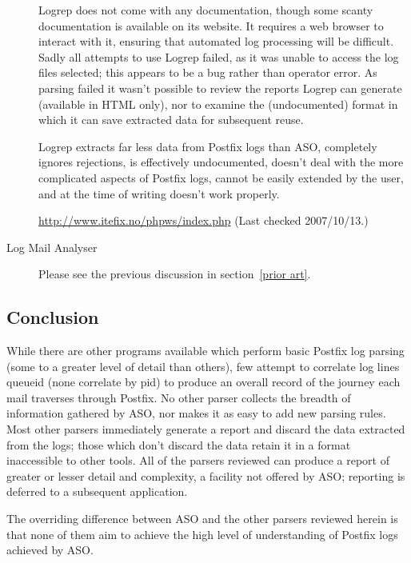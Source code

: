 \documentclass[a4paper,12pt,draft]{article}
\newcommand{\parsername}{ASO}
\begin{document}
\begin{description}
        Logrep does not come with any documentation, though some scanty
        documentation is available on its website.  It requires a web
        browser to interact with it, ensuring that automated log processing
        will be difficult.  Sadly all attempts to use Logrep failed, as it
        was unable to access the log files selected; this appears to be a
        bug rather than operator error.  As parsing failed it wasn't
        possible to review the reports Logrep can generate (available in
        HTML only), nor to examine the (undocumented) format in which it
        can save extracted data for subsequent reuse.

        Logrep extracts far less data from Postfix logs than \parsername{},
        completely ignores rejections, is effectively undocumented, doesn't
        deal with the more complicated aspects of Postfix logs, cannot be
        easily extended by the user, and at the time of writing doesn't
        work properly.

        \url{http://www.itefix.no/phpws/index.php} \newline (Last checked
        2007/10/13.)

    \item [Log Mail Analyser] Please see the previous discussion in
        section~\ref{prior art}.

\end{description}

\subsection{Conclusion}

While there are other programs available which perform basic Postfix log
parsing (some to a greater level of detail than others), few
attempt to correlate log lines queueid (none correlate by pid) to produce
an overall record of the journey each mail traverses through Postfix.  No
other parser collects the breadth of information gathered by \parsername{},
nor makes it as easy to add new parsing rules.  Most other parsers
immediately generate a report and discard the data extracted from the logs;
those which don't discard the data retain it in a format inaccessible to
other tools.  All of the parsers reviewed can produce a report of greater
or lesser detail and complexity, a facility not offered by \parsername{};
reporting is deferred to a subsequent application.

The overriding difference between \parsername{} and the other parsers
reviewed herein is that none of them aim to achieve the high level of
understanding of Postfix logs achieved by \parsername{}.
\end{document}
